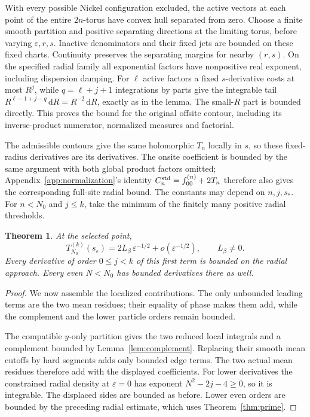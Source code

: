 \documentclass[11pt]{article}
\numberwithin{equation}{section}
\newtheorem{theorem}{Theorem}[section]
\theoremstyle{definition}
\newcommand{\dd}{\,\mathrm d}
\newcommand{\eps}{\varepsilon}
\newcommand{\se}{s_\varepsilon}
\begin{document}
With every possible Nickel configuration excluded, the active vectors
at each point of the entire \(2n\)-torus have convex hull separated from zero. Choose a finite
smooth partition and positive separating directions at the limiting
torus, before varying \(\eps,r,s\). Inactive denominators and their
fixed jets are bounded on these fixed charts. Continuity preserves
the separating margins for nearby \((r,s)\). On the specified radial
family all exponential factors have nonpositive real exponent,
including dispersion damping. For \(\ell\) active factors a fixed
\(s\)-derivative costs at most \(R^j\), while
\(q=\ell+j+1\) integrations by parts give the integrable tail
\(R^{\ell-1+j-q}\dd R=R^{-2}\dd R\), exactly as in the lemma.
The small-\(R\) part is bounded directly. This proves the bound for
the original offsite contour, including its inverse-product numerator,
normalized measures and factorial.

The admissible contours give the same holomorphic \(T_n\) locally
in \(s\), so these fixed-radius derivatives are its derivatives.
The onsite coefficient is bounded by the same argument with both
global product factors omitted; Appendix~\ref{app:normalization}'s
identity \(C_n^{\rm std}=f_{00}^{(n)}+2T_n\) therefore also gives the
corresponding full-site radial bound. The constants may depend on
\(n,j,s_*\). For \(n<N_0\) and \(j\le k\), take the minimum of the
finitely many positive radial thresholds.

\begin{theorem}\label{thm:first}
At the selected point,
\[
 T_{N_0}^{(k)}(\se)=2L_\beta\,\eps^{-1/2}+o(\eps^{-1/2}),
 \qquad L_\beta\ne0.
\]
Every derivative of order \(0\le j<k\) of this first term is bounded
on the radial approach. Every even \(N<N_0\) has bounded derivatives
there as well.
\end{theorem}
\begin{proof}
We now assemble the localized contributions. The only unbounded leading terms are the two mean residues; their equality of phase makes them add, while the complement and the lower particle orders remain bounded.

The compatible \(y\)-only partition gives the two reduced local
integrals and a complement bounded by Lemma~\ref{lem:complement}.
Replacing their smooth mean cutoffs by hard segments adds only bounded
edge terms. The two actual mean residues therefore add with the
displayed coefficients. For lower derivatives the constrained radial
density at \(\eps=0\)
has exponent \(N^2-2j-4\ge0\), so it is integrable.
The displaced sides are bounded as before. Lower even orders are
bounded by the preceding radial estimate, which uses
Theorem~\ref{thm:prime}.
\end{proof}
\end{document}
